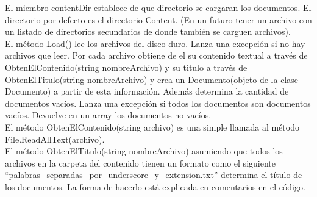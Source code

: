 \documentclass{article}
\begin{document}
El miembro contentDir establece de que directorio se cargaran los documentos. El directorio por defecto es el directorio Content. (En un futuro tener un archivo con un listado de directorios secundarios de donde también se carguen archivos).\\
El método Load() lee los archivos del disco duro. Lanza una excepción si no hay archivos que leer. Por cada archivo obtiene de el su contenido textual a través de ObtenElContenido(string nombreArchivo) y su titulo a través de ObtenElTitulo(string nombreArchivo) y crea un Documento(objeto de la clase Documento) a partir de esta información. Además determina la cantidad de documentos vacíos. Lanza una excepción si todos los documentos son documentos vacíos. Devuelve en un array los documentos no vacíos.\\
El método ObtenElContenido(string archivo) es una simple llamada al método File.ReadAllText(archivo).\\
El método ObtenElTitulo(string nombreArchivo) asumiendo que todos los archivos en la carpeta del contenido tienen un formato como el siguiente “palabras\_separadas\_por\_underscore\_y\_extension.txt” determina el título de los documentos. La forma de hacerlo está explicada en comentarios en el código.\\
\end{document}
